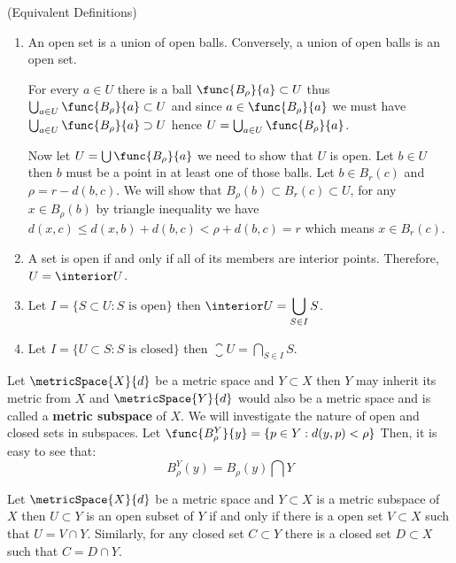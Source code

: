 \begin{remark} (Equivalent Definitions)
    \begin{enumerate}
        \item An open set is a union of open balls. Conversely, a union of open balls is an open set.
              \begin{prooflemma}
                  For every \(a \in U\) there is a ball \(\func{B_\rho}{a} \subset U\) thus \(\bigcup_{a \in U}{\func{B_\rho}{a}} \subset U\) and since \(a \in \func{B_\rho}{a}\) we must have \(\bigcup_{a \in U}{\func{B_\rho}{a}} \supset U\) hence \(U = \bigcup_{a \in U}{\func{B_\rho}{a}}\).

                  Now let \(U = \bigcup {\func{B_\rho}{a}}\) we need to show that \(U\) is open. Let \(b \in U\) then \(b\) must be a point in at least one of those balls. Let \(b \in B_r(c)\) and \(\rho = r - d(b,c)\). We will show that \(B_\rho(b) \subset B_r(c) \subset U\), for any \(x \in B_\rho(b)\) by triangle inequality we have \(d(x,c) \leq d(x,b) + d(b,c) < \rho + d(b,c) = r\) which means \(x \in B_r(c)\).
              \end{prooflemma}
        \item A set is open if and only if all of its members are interior points. Therefore, \(U = \interior U\).
        \item Let \(I = \{ S \subset U : S \text{ is open}\}\) then \(\interior U = \displaystyle{ \bigcup_{S \in I} S}\).
        \item Let \(I = \{ U \subset S : S \text{ is closed}\}\) then \(\closure U = \displaystyle{ \bigcap_{S \in I} S}\).
    \end{enumerate}
\end{remark}

Let \(\metricSpace{X}{d}\) be a metric space and \(Y \subset X\) then \(Y\) may inherit its metric from \(X\) and \(\metricSpace{Y}{d}\) would also be a metric space and is called a \textbf{metric subspace} of \(X\). We will investigate the nature of open and closed sets in subspaces. Let \(\func{B_\rho^Y}{y} = \{ p \in Y : d(y,p) < \rho\}\) Then, it is easy to see that:
\[B_\rho^Y(y) = B_\rho(y) \bigcap Y \]

\begin{corollary} \label{InheritancePrinciple}
    Let \(\metricSpace{X}{d}\) be a metric space and \(Y \subset X\) is a metric subspace of \(X\) then \(U \subset Y\) is an open subset of \(Y\) if and only if there is a open set \(V \subset X\) such that \(U = V \cap Y\). Similarly, for any closed set \(C \subset Y\) there is a closed set \(D \subset X\) such that \(C = D \cap Y\).
\end{corollary}

